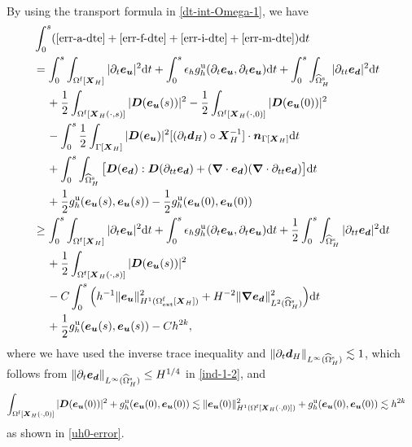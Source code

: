 \documentclass[11pt,reqno]{amsart}
\theoremstyle{definition}
\theoremstyle{plain}
\numberwithin{theorem}{section}
\numberwithin{proposition}{section}
\numberwithin{lemma}{section}
\numberwithin{equation}{section}
\newcommand{\bs}[1]{\boldsymbol{#1}}
\newcommand{\uu}[1]  {{\bs{#1}} }
\newcommand{\dep}{{{\bs{d}}}}
\newcommand{\grad}   { \uu{\nabla}    }
\def\d{\mathrm{d}}
\renewcommand{\(}{\bigl(}
\renewcommand{\)}{\bigr)}
\begin{document}
\\
By using the transport formula in \eqref{dt-int-Omega-1}, we have 
\begin{align}
&\int_0^s(\eqref{err-a-dte}+\eqref{err-f-dte}+\eqref{err-i-dte}+\eqref{err-m-dte})\d t \notag\\ 
&=
\int_0^s\int_{\Omega^{\rm f}[\bs X_H]} |\partial_t {\bs e}_{\bs u} |^2 \d t 
+ \int_0^s \epsilon_h g_h^{\rm u} (\partial_t{\bs e}_{\bs u}, \partial_t{\bs e}_{\bs u}) \d t 
+ \int_0^s\int_{\widehat{\Omega}^{\rm s}_H} |\partial_{tt} {\bs e}_{\dep} |^2 \d t \notag\\
&\quad\,
+ \frac12\int_{\Omega^{\rm f}[\bs X_H(\cdot,s)]} |{\bs D}({\bs e}_{\bs u}(s))|^2 -  \frac12\int_{\Omega^{\rm f}[\bs X_H(\cdot,0)]} |{\bs D}({\bs e}_{\bs u}(0))|^2 \notag\\
&\quad\, 
- \int_0^s\frac12\int_{\Gamma[{\bs X}_H]} |{\bs D}({\bs e}_{\bs u})|^2 [(\partial_t{\bs d}_H)\circ {\bs X}_H^{-1} ]\cdot {\bs n}_{\Gamma[{\bs X}_H]} \d t \notag\\
&\quad\, + \int_0^s \int_{\widehat{\Omega}^{\rm s}_H} \big[ {\bs D}({\bs e}_\dep):{\bs D}(\partial_{tt}{\bs e}_\dep) + (\grad\cdot {\bs e}_\dep ) (\grad\cdot \partial_{tt}{\bs e}_\dep ) \big] \d t \notag\\
&\quad\, 
+ \frac12  g_h^{\rm u} ({\bs e}_{\bs u}(s),{\bs e}_{\bs u}(s)) 
- \frac12  g_h^{\rm u} ({\bs e}_{\bs u}(0),{\bs e}_{\bs u}(0)) \notag\\ 
&\ge 
\int_0^s\int_{\Omega^{\rm f}[\bs X_H]} |\partial_t {\bs e}_{\bs u} |^2 \d t 
+ \int_0^s \epsilon_h g_h^{\rm u} (\partial_t{\bs e}_{\bs u}, \partial_t{\bs e}_{\bs u}) \d t 
+ \frac12\int_0^s\int_{\widehat{\Omega}^{\rm s}_H} |\partial_{tt} {\bs e}_{\dep} |^2 \d t \notag\\
&\quad\,
+ \frac12\int_{\Omega^{\rm f}[\bs X_H(\cdot,s)]} |{\bs D}({\bs e}_{\bs u}(s))|^2 \notag\\
&\quad\, 
- C\int_0^s \Big( h^{-1}\|{\bs e}_{\bs u}\|_{H^1(\Omega^{\rm f}_{\rm ext}[{\bs X}_H])}^2 + H^{-2}\|\grad{\bs e}_{\bs d}\|_{L^2(\widehat\Omega^{\rm s}_H)}^2 \Big) \d t \notag\\ 
&\quad\, 
+ \frac12 g_h^{\rm u} ({\bs e}_{\bs u}(s),{\bs e}_{\bs u}(s)) 
- Ch^{2k} , 
\label{err-afim-dte}
\end{align}
where we have used the inverse trace inequality and $\|\partial_t{\bs d}_H\|_{L^\infty(\widehat\Omega^{\rm s}_H)}\lesssim 1$, which follows from $\|\partial_t{\bs e}_\dep\|_{L^\infty(\widehat{\Omega}^{\rm s}_H)}\le H^{1/4}$ in \eqref{ind-1-2}, and 
\begin{align*}
\int_{\Omega^{\rm f}[\bs X_H(\cdot,0)]} |{\bs D}({\bs e}_{\bs u}(0))|^2
+ g_h^{\rm u} ({\bs e}_{\bs u}(0),{\bs e}_{\bs u}(0)) 
&\lesssim 
\|{\bs e}_{\bs u}(0)\|_{H^1(\Omega^{\rm f}[\bs X_H(\cdot,0)])}^2
+ g^{\rm u}_h({\bs e}_{\bs u}(0),{\bs e}_{\bs u}(0)) 
\lesssim h^{2k} 
\end{align*}
as shown in \eqref{uh0-error}. 
\end{document}
